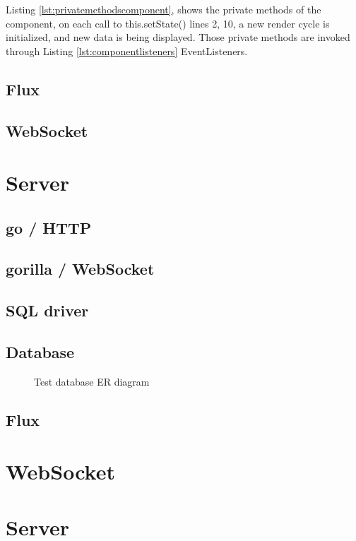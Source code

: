 


Listing \ref{lst:privatemethodscomponent}, shows the private methods of the component, on each call to this.setState() lines 2, 10, a new render cycle is initialized, and new data is being displayed. Those private methods are invoked through Listing \ref{lst:componentlisteners} EventListeners.

\subsection{Flux}
\subsection{WebSocket}

\section{Server}
\subsection{go / HTTP}
\subsection{gorilla / WebSocket}
\subsection{SQL driver}
\subsection{Database}

\begin{figure}[h]
  \centering
  \scalebox{0.4}{
  }
  \caption{Test database ER diagram}
  \label{fig:groupmanagement}
\end{figure}

\subsection{Flux}

\section{WebSocket}

\section{Server}

